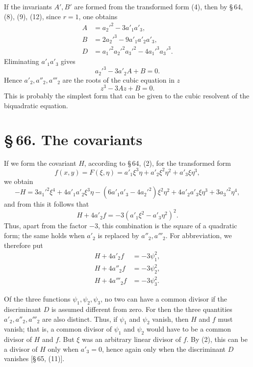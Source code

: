 \documentclass[11pt]{article}
\newcommand{\sect}[2]{\section*{\S\,#1. #2}}
\begin{document}
If the invariants $A',B'$ are formed from the transformed form (4), then by \S\,64, (8), (9), (12), since $r=1$, one obtains
\begin{equation}
\begin{aligned}
 A&=a_2'^2-3a'_1a'_3,\\
 B&=2a_2'^3-9a'_1a'_2a'_3,\\
 D&=a_1'^2a_2'^2a_3'^2-4a_1'^3a_3'^3.
\end{aligned}
\tag{11}
\end{equation}
Eliminating $a'_1a'_3$ gives
\[
 a_2'^3-3a'_2A+B=0.
\]
Hence $a'_2,a''_2,a'''_2$ are the roots of the cubic equation in $z$
\begin{equation}
 z^3-3Az+B=0.
\tag{12}
\end{equation}
This is probably the simplest form that can be given to the cubic resolvent of the biquadratic equation.

\sect{66}{The covariants}

If we form the covariant $H$, according to \S\,64, (2), for the transformed form
\begin{equation}
 f(x,y)=F(\xi,\eta)=a'_1\xi^3\eta+a'_2\xi^2\eta^2+a'_3\xi\eta^3,
\tag{1}
\end{equation}
we obtain
\begin{equation}
 -H=3a_1'^2\xi^4+4a'_1a'_2\xi^3\eta-(6a'_1a'_3-4a_2'^2)\xi^2\eta^2+4a'_2a'_3\xi\eta^3+3a_3'^2\eta^4,
\tag{2}
\end{equation}
and from this it follows that
\begin{equation}
 H+4a'_2f=-3(a'_1\xi^2-a'_3\eta^2)^2.
\tag{3}
\end{equation}
Thus, apart from the factor $-3$, this combination is the square of a quadratic form; the same holds when $a'_2$ is replaced by $a''_2,a'''_2$. For abbreviation, we therefore put
\begin{equation}
\begin{aligned}
 H+4a'_2f&=-3\psi_1^2,\\
 H+4a''_2f&=-3\psi_2^2,\\
 H+4a'''_2f&=-3\psi_3^2.
\end{aligned}
\tag{4}
\end{equation}

Of the three functions $\psi_1,\psi_2,\psi_3$, no two can have a common divisor if the discriminant $D$ is assumed different from zero. For then the three quantities $a'_2,a''_2,a'''_2$ are also distinct. Thus, if $\psi_1$ and $\psi_2$ vanish, then $H$ and $f$ must vanish; that is, a common divisor of $\psi_1$ and $\psi_2$ would have to be a common divisor of $H$ and $f$. But $\xi$ was an arbitrary linear divisor of $f$. By (2), this can be a divisor of $H$ only when $a'_3=0$, hence again only when the discriminant $D$ vanishes [\S\,65, (11)].
\end{document}
